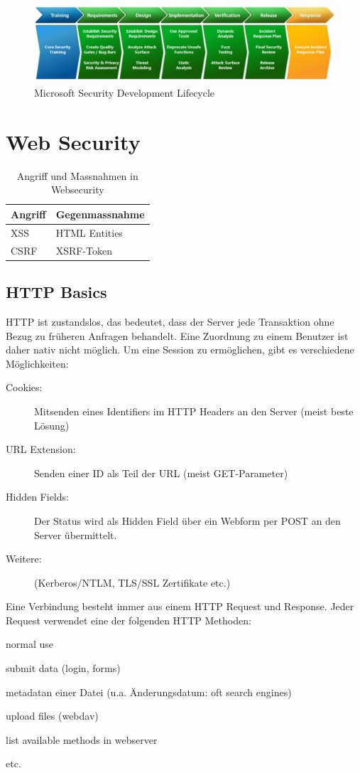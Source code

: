 \begin{figure}[h!]
	\centering
	\includegraphics[width=0.7\linewidth]{images/microsoft_sdl}
	\caption{Microsoft Security Development Lifecycle}
	\label{fig:microsoftsdl}
\end{figure}

\section{Web Security}
\begin{table}[h]
	\centering
	\begin{tabu} to \linewidth {X X}
		\toprule
		Angriff & Gegenmassnahme \\
		\midrule
		XSS & HTML Entities \\
		CSRF & XSRF-Token \\
		\bottomrule
	\end{tabu}
	\caption{Angriff und Massnahmen in Websecurity}
\end{table}

\subsection{HTTP Basics}
HTTP ist zustandslos, das bedeutet, dass der Server jede Transaktion ohne Bezug zu früheren Anfragen behandelt. Eine Zuordnung zu einem Benutzer ist daher nativ nicht möglich. Um eine Session zu ermöglichen, gibt es verschiedene Möglichkeiten:

\begin{description}
	\item[Cookies:] Mitsenden eines Identifiers im HTTP Headers an den Server (meist beste Lösung)
	\item[URL Extension:] Senden einer ID als Teil der URL (meist GET-Parameter)
	\item[Hidden Fields:] Der Status wird als Hidden Field über ein Webform per POST an den Server übermittelt.
	\item[Weitere:] (Kerberos/NTLM, TLS/SSL Zertifikate etc.)
\end{description}

Eine Verbindung besteht immer aus einem HTTP Request und Response. Jeder Request verwendet eine der folgenden HTTP Methoden:
\begin{description}
	\item[GET:] normal use 
	\item[POST:] submit data (login, forms)
	\item[HEADER:] metadatan einer Datei (u.a. Änderungsdatum: oft search engines)
	\item[PUT:] upload files (webdav)
	\item[OPTIONS:] list available methods in webserver
	\item etc.
\end{description}

